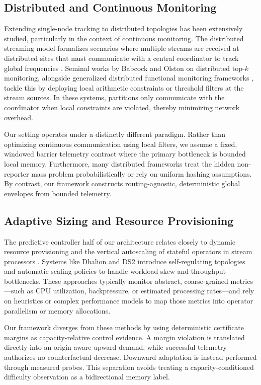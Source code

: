\documentclass[sigconf, nonacm]{acmart}
\begin{document}
\subsection{Distributed and Continuous Monitoring}
Extending single-node tracking to distributed topologies has been extensively studied, particularly in the context of continuous monitoring. The distributed streaming model formalizes scenarios where multiple streams are received at distributed sites that must communicate with a central coordinator to track global frequencies \cite{zhang2013optimal}. Seminal works by Babcock and Olston \cite{babcock2003distributed} on distributed top-$k$ monitoring, alongside generalized distributed functional monitoring frameworks \cite{cormode2012continuous}, tackle this by deploying local arithmetic constraints or threshold filters at the stream sources. In these systems, partitions only communicate with the coordinator when local constraints are violated, thereby minimizing network overhead. 

Our setting operates under a distinctly different paradigm. Rather than optimizing continuous communication using local filters, we assume a fixed, windowed barrier telemetry contract where the primary bottleneck is bounded local memory. Furthermore, many distributed frameworks treat the hidden non-reporter mass problem probabilistically or rely on uniform hashing assumptions. By contrast, our framework constructs routing-agnostic, deterministic global envelopes from bounded telemetry.

\subsection{Adaptive Sizing and Resource Provisioning}
The predictive controller half of our architecture relates closely to dynamic resource provisioning and the vertical autoscaling of stateful operators in stream processors \cite{kalavri2020performance}. Systems like Dhalion \cite{floratou2017dhalion} and DS2 \cite{kalavri2018three} introduce self-regulating topologies and automatic scaling policies to handle workload skew and throughput bottlenecks. These approaches typically monitor abstract, coarse-grained metrics---such as CPU utilization, backpressure, or estimated processing rates---and rely on heuristics or complex performance models to map those metrics into operator parallelism or memory allocations.

Our framework diverges from these methods by using deterministic certificate margins as capacity-relative control evidence. A margin violation is translated directly into an origin-aware upward demand, while successful telemetry authorizes no counterfactual decrease. Downward adaptation is instead performed through measured probes. This separation avoids treating a capacity-conditioned difficulty observation as a bidirectional memory label.
\end{document}

